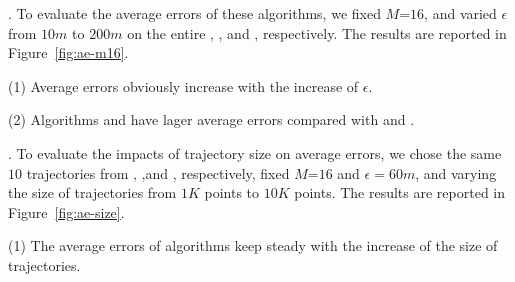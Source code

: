 .
To evaluate the average errors of these algorithms, we fixed {$M$=$16$}, and varied $\epsilon$ from $10m$ to $200m$ on the entire \truck, \sercar, \geolife and \pricar, respectively.
The results are reported in Figure~\ref{fig:ae-m16}.

\ni(1) Average errors obviously increase with the increase of $\epsilon$.

\ni(2) Algorithms \cist and \cista have lager average errors compared with \dps and \squishe.




.
To evaluate the impacts of trajectory size on average errors, we chose the same {$10$} trajectories from \truck, \sercar,\geolife and \pricar, respectively,
fixed {$M$=$16$} and $\epsilon = 60m$, and varying the size  of trajectories from $1K$ points to $10K$ points.
%
The results are reported in Figure~\ref{fig:ae-size}.

\ni(1) The average errors of \lsa algorithms keep steady with the increase of the size of trajectories.




